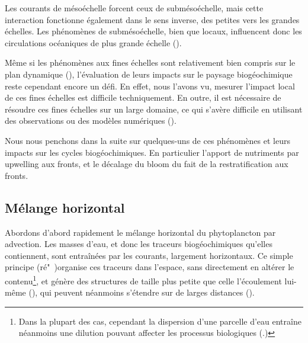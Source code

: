 Les courants de mésoéchelle forcent ceux de submésoéchelle, mais cette interaction fonctionne également dans le sens inverse, des petites vers les grandes échelles.
Les phénomènes de submésoéchelle, bien que locaux, influencent donc les circulations océaniques de plus grande échelle (\cite{sasaki_2020,balwada_2022,naveiragarabato_2022,taylor_2023}).


Même si les phénomènes aux fines échelles sont relativement bien compris sur le plan dynamique (\cite{mcwilliams_2016,mcwilliams_2019,gula_2022,taylor_2023}), l'évaluation de leurs impacts sur le paysage biogéochimique reste cependant encore un défi.
En effet, nous l'avons vu, mesurer l'impact local de ces fines échelles est difficile techniquement.
En outre, il est nécessaire  de résoudre ces fines échelles sur un large domaine, ce qui s'avère difficile en utilisant des observations ou des modèles numériques (\cite{fox-kemper_2019,levy_2023}).

Nous nous penchons dans la suite sur quelques-uns de ces phénomènes et leurs impacts sur les cycles biogéochimiques.
En particulier l'apport de nutriments par upwelling aux fronts, et le décalage du bloom du fait de la restratification aux fronts.

\subsection{Mélange horizontal}

Abordons d'abord rapidement le mélange horizontal du phytoplancton par advection.
Les masses d'eau, et donc les traceurs biogéochimiques qu'elles contiennent, sont entraînées par les courants, largement horizontaux.
Ce simple principe (ré"~)organise ces traceurs dans l'espace, sans directement en altérer le contenu\footnote{%
  Dans la plupart des cas, cependant la dispersion d'une parcelle d'eau entraîne néanmoins une dilution pouvant affecter les processus biologiques (\cite{lehahn_2017}.)
}, et génère des structures de taille plus petite que celle l'écoulement lui-même  (\cite{abraham_1998,lehahn_2007,dovidio_2010,levy_2018,lehahn_2018}), qui peuvent néanmoins s'étendre sur de larges distances (\cite{sergi_2020}).
\enlargethispage{2\baselineskip}

